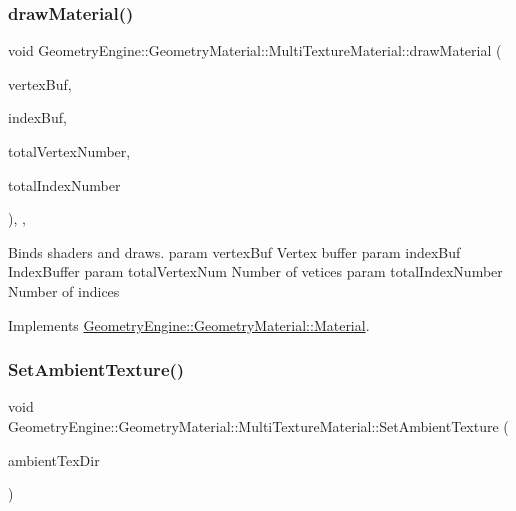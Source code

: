 \subsubsection{\texorpdfstring{drawMaterial()}{drawMaterial()}}
{\footnotesize\ttfamily void Geometry\+Engine\+::\+Geometry\+Material\+::\+Multi\+Texture\+Material\+::draw\+Material (\begin{DoxyParamCaption}\item[{Q\+Open\+G\+L\+Buffer $\ast$}]{vertex\+Buf,  }\item[{Q\+Open\+G\+L\+Buffer $\ast$}]{index\+Buf,  }\item[{unsigned int}]{total\+Vertex\+Number,  }\item[{unsigned int}]{total\+Index\+Number }\end{DoxyParamCaption})\hspace{0.3cm}{\ttfamily [override]}, {\ttfamily [protected]}, {\ttfamily [virtual]}}

Binds shaders and draws. param vertex\+Buf Vertex buffer param index\+Buf Index\+Buffer param total\+Vertex\+Num Number of vetices param total\+Index\+Number Number of indices 

Implements \mbox{\hyperlink{class_geometry_engine_1_1_geometry_material_1_1_material_a0070eab6e5fe86dc05dc69f2e37b9072}{Geometry\+Engine\+::\+Geometry\+Material\+::\+Material}}.

\mbox{\label{class_geometry_engine_1_1_geometry_material_1_1_multi_texture_material_a2679c169c654bb65728ef21db60d5637}} 
\subsubsection{\texorpdfstring{SetAmbientTexture()}{SetAmbientTexture()}}
{\footnotesize\ttfamily void Geometry\+Engine\+::\+Geometry\+Material\+::\+Multi\+Texture\+Material\+::\+Set\+Ambient\+Texture (\begin{DoxyParamCaption}\item[{const std\+::string \&}]{ambient\+Tex\+Dir }\end{DoxyParamCaption})}

